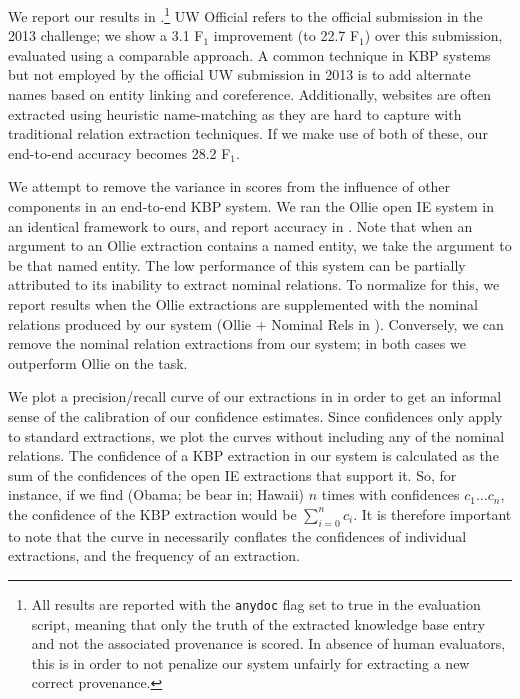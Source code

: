 We report our results in .\footnote{
  All results are reported with the \texttt{anydoc} flag set to true
    in the evaluation script, meaning that only the truth of the extracted
    knowledge base entry and not the associated provenance is scored.
  In absence of human evaluators, this is in order to not penalize our 
    system unfairly for extracting a new correct provenance.
  }
UW Official refers to the official submission in the 2013 challenge;
  we show a 3.1 F$_1$ improvement (to 22.7 F$_1$) over this submission, 
  evaluated using a comparable approach.
A common technique in KBP systems but not employed by the official UW
  submission in 2013 is to add alternate names 
  based on entity linking and coreference.
Additionally, websites are often extracted using heuristic name-matching
  as they are hard to capture with traditional relation extraction 
  techniques.
If we make use of both of these, our end-to-end accuracy becomes 28.2 F$_1$.

We attempt to remove the variance in scores from the influence of 
  other components in an end-to-end KBP system.
We ran the Ollie open IE system \cite{key:2012mausam-ollie} in an identical
  framework to ours, and report accuracy in .
Note that when an argument to an Ollie extraction contains a named entity, 
  we take the argument to be that named entity.
The low performance of this system can be partially attributed to its inability
  to extract nominal relations.
To normalize for this, we report results when the Ollie extractions are
  supplemented with the nominal relations produced by our system
  (Ollie + Nominal Rels in ).
Conversely, we can remove the nominal relation extractions from
  our system; in both cases we outperform Ollie on the task.


We plot a precision/recall curve of our extractions in  in order 
  to get an informal sense of the calibration of our confidence estimates.
Since confidences only apply to standard extractions, we plot the curves
  without including any of the nominal relations.
The confidence of a KBP extraction in our system is calculated as the sum
  of the confidences of the open IE extractions that support it.
So, for instance, if we find (Obama; be bear in; Hawaii) $n$ times with
  confidences $c_1 \dots c_n$, the confidence of the KBP extraction would be
  $\sum_{i=0}^n c_i$.
It is therefore important to note that the curve in  necessarily
  conflates the confidences of individual extractions, and the frequency
  of an extraction.

